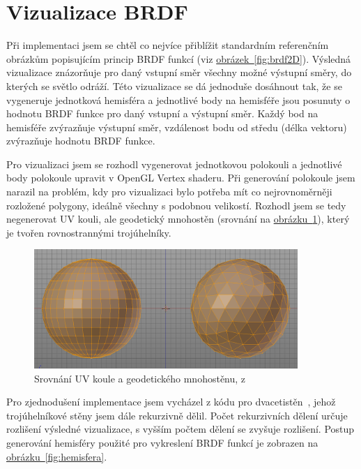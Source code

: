\documentclass[czech,master]{diploma}
\begin{document}
\section{Vizualizace BRDF}
Při implementaci jsem se chtěl co nejvíce přiblížit standardním referenčním obrázkům popisujícím princip BRDF funkcí (viz \hyperref[fig:brdf2D]{obrázek~\ref{fig:brdf2D}}). Výsledná vizualizace znázorňuje  pro daný vstupní směr všechny možné výstupní směry, do kterých se světlo odráží. Této vizualizace se dá jednoduše dosáhnout tak, že se vygeneruje jednotková hemisféra a jednotlivé body na hemisféře jsou posunuty o hodnotu BRDF funkce pro daný vstupní a výstupní směr. Každý bod na hemisféře zvýrazňuje výstupní směr, vzdálenost bodu od středu (délka vektoru) zvýrazňuje hodnotu BRDF funkce. \par
Pro vizualizaci jsem se rozhodl vygenerovat jednotkovou polokouli a jednotlivé body polokoule upravit v OpenGL Vertex shaderu. Při generování polokoule jsem narazil na problém, kdy pro vizualizaci bylo potřeba mít co nejrovnoměrněji rozložené polygony, ideálně všechny s podobnou velikostí. Rozhodl jsem se tedy negenerovat UV kouli, ale geodetický mnohostěn (srovnání na \hyperref[fig:spheresComparison]{obrázku~\ref{fig:spheresComparison}}), který je tvořen rovnostrannými trojúhelníky.  \par

\begin{figure}[ht]
  \centering
  \includegraphics[width=10cm]{Figures/IcosphereUVSphereComparison.png}
  \caption{Srovnání UV koule a geodetického mnohostěnu, z~\cite{tan_2019}}
  \label{fig:spheresComparison}
\end{figure}
Pro zjednodušení implementace jsem vycházel z kódu pro dvacetistěn~\cite{OpenGLSphere}, jehož trojúhelníkové stěny jsem dále rekurzivně dělil. Počet rekurzivních dělení určuje rozlišení výsledné vizualizace, s vyšším počtem dělení se zvyšuje rozlišení. Postup generování hemisféry použité pro vykreslení BRDF funkcí je zobrazen na \hyperref[fig:hemisfera]{obrázku~\ref{fig:hemisfera}}.\par
\end{document}
